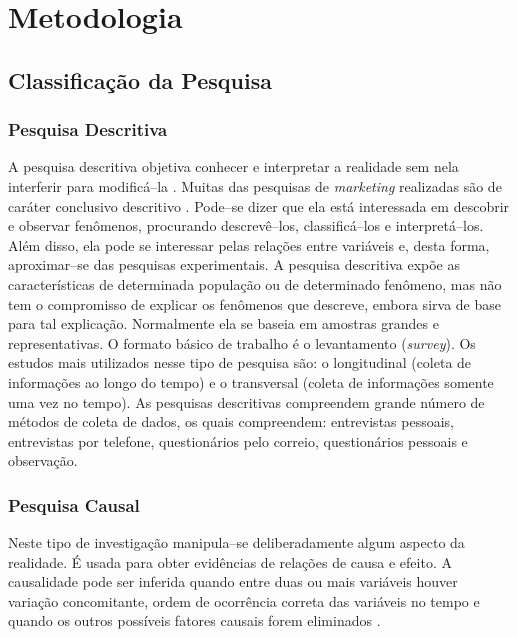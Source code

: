 \chapter{Metodologia}
\label{cap:metodologia}

\section{Classifica\c{c}\~ao da Pesquisa}

\subsection{Pesquisa Descritiva}

A pesquisa descritiva objetiva conhecer e interpretar a realidade sem nela interferir para modific\'a--la \cite{churchill2009marketing}. Muitas das pesquisas de \emph{marketing} realizadas s\~ao de car\'ater conclusivo descritivo \cite{perin2000pesquisa}. Pode--se dizer que ela est\'a interessada em descobrir e observar fen\^omenos, procurando descrev\^e--los, classific\'a--los e interpret\'a--los. Al\'em disso, ela pode se interessar pelas rela\c{c}\~oes entre vari\'aveis e, desta forma, aproximar--se das pesquisas experimentais. A pesquisa descritiva exp\~oe as caracter\'isticas de determinada popula\c{c}\~ao ou de determinado fen\^omeno, mas n\~ao tem o compromisso de explicar os fen\^omenos que descreve, embora sirva de base para tal explica\c{c}\~ao. Normalmente ela se baseia em amostras grandes e representativas. O formato b\'asico de trabalho \'e o levantamento (\emph{survey}). Os estudos mais utilizados nesse tipo de pesquisa s\~ao: o longitudinal (coleta de informa\c{c}\~oes ao longo do tempo) e o transversal (coleta de informa\c{c}\~oes somente uma vez no tempo). As pesquisas descritivas compreendem grande n\'umero de m\'etodos de coleta de dados, os quais compreendem: entrevistas pessoais, entrevistas por telefone, question\'arios pelo correio, question\'arios pessoais e observa\c{c}\~ao.

\subsection{Pesquisa Causal}

Neste tipo de investiga\c{c}\~ao manipula--se deliberadamente algum aspecto da realidade. \'E usada para obter evid\^encias de rela\c{c}\~oes de causa e efeito. A causalidade pode ser inferida quando entre duas ou mais vari\'aveis houver varia\c{c}\~ao concomitante, ordem de ocorr\^encia correta das vari\'aveis no tempo e quando os outros poss\'iveis fatores causais forem eliminados \cite{mattar1996pesquisa}.

